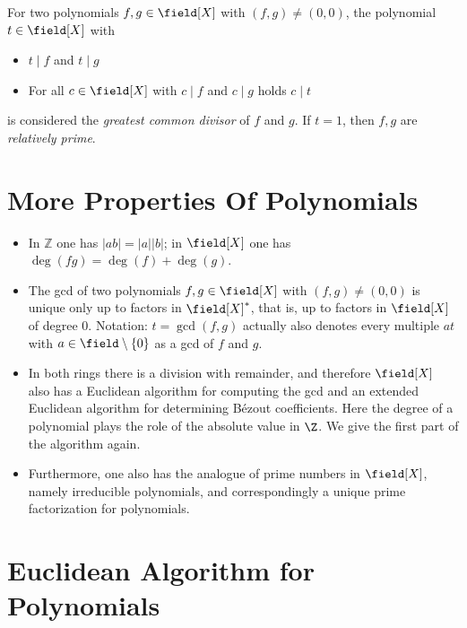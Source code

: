 For two polynomials \(f,g \in \field[X]\) with \((f,g) \ne (0,0)\), the polynomial \(t \in \field[X]\) with 

\begin{itemize}

    \item \(t \mid f\) and \(t \mid g\)

    \item For all \(c \in \field[X]\) with \(c \mid f\) and \(c \mid g\) holds \(c \mid t\)

\end{itemize}

is considered the \emph{greatest common divisor} of \(f\) and \(g\). If \(t = 1\),  then \(f,g\) are \emph{relatively prime}.

\section{More Properties Of Polynomials}

\begin{itemize}

    \item In \(\mathbb{Z}\) one has \(|ab| = |a||b|\); in \(\field[X]\) one has 
    \(\deg(fg) = \deg(f) + \deg(g)\).

    \item The gcd of two polynomials \(f, g \in \field[X]\) with \((f,g) \neq (0,0)\) is unique only up to factors in \(\field[X]^{\ast}\), 
    that is, up to factors in \(\field[X]\) of degree \(0\). Notation: \(t = \gcd(f,g)\) actually also denotes every multiple \(a t\) with 
    \(a \in \field \setminus \{0\}\) as a gcd of \(f\) and \(g\).

    \item In both rings there is a division with remainder, and therefore \(\field[X]\) also has a Euclidean algorithm for computing 
    the gcd and an extended Euclidean algorithm for determining Bézout coefficients. Here the degree of a polynomial plays the role of the 
    absolute value in \(\Z\). We give the first part of the algorithm again.

    \item Furthermore, one also has the analogue of prime numbers in \(\field[X]\), namely irreducible polynomials, and correspondingly a unique prime 
    factorization for polynomials.

\end{itemize}

\section{Euclidean Algorithm for Polynomials}

